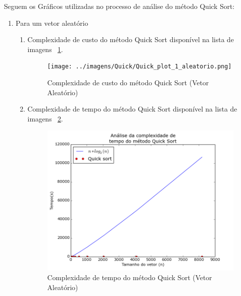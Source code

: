 \documentclass[12pt,a4paper,twoside]{report}
\begin{document}
Seguem os Gráficos utilizadas no processo de análise do método Quick Sort:
\begin{enumerate}

	\item Para um vetor aleatório
	\begin{enumerate}
		\item Complexidade de custo do método Quick Sort disponível na lista de imagens ~\ref{fig:QuickPlot1A}.
		\begin{figure}[!h]
			\centering
			\texttt{[image: ../imagens/Quick/Quick\_plot\_1\_aleatorio.png]}
			\caption{Complexidade de custo do método Quick Sort (Vetor Aleatório) \label{fig:QuickPlot1A}}
		\end{figure}


		\item Complexidade de tempo do método Quick Sort disponível na lista de imagens ~\ref{fig:QuickPlot2A}.
		\begin{figure}[!h]
			\centering
			\includegraphics[scale=0.6]{../imagens/Quick/Quick_plot_2_aleatorio.png}
			\caption{Complexidade de tempo do método Quick Sort (Vetor Aleatório)\label{fig:QuickPlot2A}}
		\end{figure}



\end{enumerate}
\end{enumerate}
\end{document}
